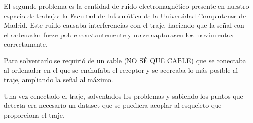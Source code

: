 El segundo problema es la cantidad de ruido electromagnético presente en nuestro espacio de trabajo: la Facultad de Informática de la Universidad Complutense de Madrid.
Este ruido causaba interferencias con el traje, haciendo que la señal con el ordenador fuese pobre constantemente y no se capturasen los movimientos correctamente.

Para solventarlo se requirió de un cable (NO SÉ QUÉ CABLE) que se conectaba al ordenador en el que se enchufaba el receptor y se acercaba lo más posible al traje, ampliando la señal al máximo.




Una vez conectado el traje, solventados los problemas y sabiendo los puntos que detecta era necesario un dataset que se puediera acoplar al esqueleto que proporciona el traje.